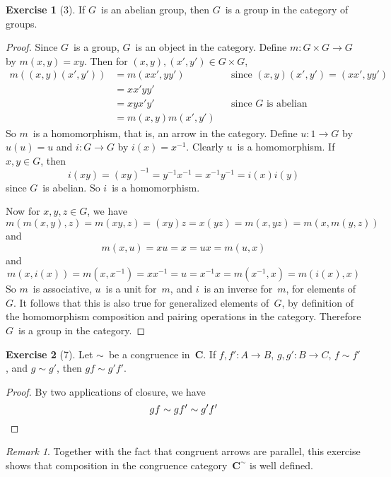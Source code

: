 \documentclass[letterpaper,12pt]{article}
\newcommand{\eq}{\sim}
\newcommand{\cat}[1]{\mathbf{#1}}
\newcommand{\C}{\cat{C}}
\theoremstyle{definition}
\newtheorem*{exer}{Exercise}
\theoremstyle{remark}
\newtheorem*{rmk}{Remark}
\theoremstyle{direction}
\begin{document}
\begin{exer}[3]
If \(G\)~is an abelian group, then \(G\)~is a group in the category of groups.
\end{exer}
\begin{proof}
Since \(G\)~is a group, \(G\)~is an object in the category. Define \(m:G\times G\to G\) by \(m(x,y)=xy\). Then for \((x,y),(x',y')\in G\times G\),
\begin{align*}
m((x,y)(x',y'))&=m(xx',yy')&&\text{since }(x,y)(x',y')=(xx',yy')\\
	&=xx'yy'&&\\
	&=xyx'y'&&\text{since \(G\)~is abelian}\\
	&=m(x,y)m(x',y')&&
\end{align*}
So \(m\)~is a homomorphism, that is, an arrow in the category. Define \(u:1\to G\) by \(u(u)=u\) and \(i:G\to G\) by \(i(x)=x^{-1}\). Clearly \(u\)~is a homomorphism. If \(x,y\in G\), then
\[i(xy)=(xy)^{-1}=y^{-1}x^{-1}=x^{-1}y^{-1}=i(x)i(y)\]
since \(G\)~is abelian. So \(i\)~is a homomorphism.

Now for \(x,y,z\in G\), we have
\[m(m(x,y),z)=m(xy,z)=(xy)z=x(yz)=m(x,yz)=m(x,m(y,z))\]
and
\[m(x,u)=xu=x=ux=m(u,x)\]
and
\[m(x,i(x))=m(x,x^{-1})=xx^{-1}=u=x^{-1}x=m(x^{-1},x)=m(i(x),x)\]
So \(m\)~is associative, \(u\)~is a unit for~\(m\), and \(i\)~is an inverse for~\(m\), for elements of~\(G\). It follows that this is also true for generalized elements of~\(G\), by definition of the homomorphism composition and pairing operations in the category. Therefore \(G\)~is a group in the category.
\end{proof}

\begin{exer}[7]
Let \(\eq\)~be a congruence in~\(\C\). If \(f,f':A\to B\), \(g,g':B\to C\), \(f\eq f'\), and \(g\eq g'\), then \(gf\eq g'f'\).
\end{exer}
\begin{proof}
By two applications of closure, we have
\[gf\eq gf'\eq g'f'\qedhere\]
\end{proof}
\begin{rmk}
Together with the fact that congruent arrows are parallel, this exercise shows that composition in the congruence category~\(\C^{\eq}\) is well defined.
\end{rmk}
\end{document}
